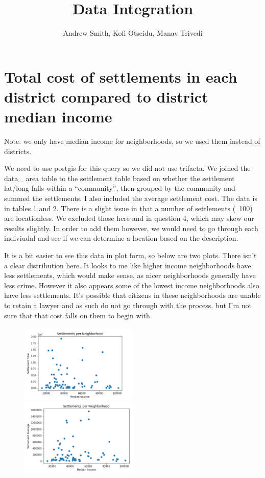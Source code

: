 \documentclass{article}
\title{Data Integration}
\author{Andrew Smith, Kofi Otseidu, Manav Trivedi}
\begin{document}
\maketitle

\section{Total cost of settlements in each district compared to district median income}

Note: we only have median income for neighborhoods, so we used them instead of districts.

We need to use postgis for this query so we did not use trifacta. We joined the data\_ area table to the settlement table based on whether the settlement lat/long falls within a “community”, then grouped by the community and summed the settlements. I also included the average settlement cost. The data is in tables 1 and 2. There is a slight issue in that a number of settlements (~100) are locationless. We excluded those here and in question 4, which may skew our results slightly. In order to add them however, we would need to go through each indiviudal and see if we can determine a location based on the description.

It is a bit easier to see this data in plot form, so below are two plots. There isn't a clear distribution here. It looks to me like higher income neighborhoods have less settlements, which would make sense, as nicer neighborhoods generally have less crime. However it also appears some of the lowest income neighborhoods also have less settlements. It's possible that citizens in these neighborhoods are unable to retain a lawyer and as such do not go through with the process, but I'm not sure that that cost falls on them to begin with.

\begin{figure}[h!]
\includegraphics[width=0.5\textwidth]{settle1.png}
\includegraphics[width=0.5\textwidth]{settle2.png}
\end{figure}
\end{document}
